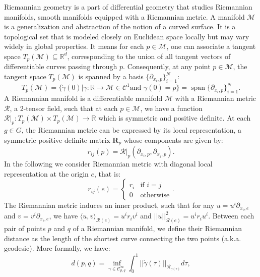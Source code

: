 \documentclass{article}
\DeclareMathOperator{\spn}{span}
\begin{document}
Riemannian geometry is a part of differential geometry that studies Riemannian manifolds, smooth manifolds equipped with a Riemannian metric. A manifold $\mathcal{M}$ is a generalization and abstraction of the notion of a curved surface. It is a topological set that is modeled closely on Euclidean space locally but may vary widely in global properties. It means for each $p \in \mathcal{M}$, one can associate a tangent space $T_p(\mathcal{M}) \subseteq \mathbb{R}^d$, corresponding to the union of all tangent vectors of differentiable curves passing through $p$. Consequently, at any point $p \in \mathcal{M}$, the tangent space $T_p(\mathcal{M})$ is spanned by a basis $\{\partial_{x_i, p} \}_{i=1}^N$:
\begin{equation}
T_p(\mathcal{M}) = \{ \dot{\gamma}(0) | \gamma : \mathbb{R} \to \mathcal{M} \in \mathcal{C}^1 \text{and } \gamma(0) = p\} = \spn\{\partial_{x_i,p} \}_{i=1}^N.
\end{equation}
A Riemannian manifold is a differentiable manifold $\mathcal{M}$ with a Riemannian metric $\mathcal{R}$, a 2-tensor field, such that at each $p \in \mathcal{M}$, we have a function $\mathcal{R}|_p : T_p (\mathcal{M}) \times T_p(\mathcal{M}) \to \mathbb{R}$ which is symmetric and positive definite. At each $g \in G$, the Riemannian metric can be expressed by its local representation, a symmetric positive definite matrix $\boldsymbol{R}_p$ whose components are given by:
\begin{equation}
r_{ij}(p) = \mathcal{R}|_p (\partial_{x_i, p}, \partial_{x_j, p}).
\end{equation}
In the following we consider Riemannian metric with  diagonal local representation at the origin $e$, that is:
\begin{equation}
r_{ij}(e) = \left\{
    \begin{array}{ll}
        r_{i} & \text{if } i = j  \\
        0 & \text{otherwise}
    \end{array}
\right..
\end{equation}
The Riemannian metric induces an inner product, such that for any $u = u^i \partial_{x_i, e}$ and $v = v^i \partial_{x_i, e}$, we have $\langle u, v \rangle_{\mathcal{R}(e)} = u^i r_i v^i$ and $|| u ||_{\mathcal{R}(e)}^2 = u^i r_i u^i$. Between each pair of points $p$ and $q$ of a Riemannian manifold, we define their Riemannian distance as the length of the shortest curve connecting the two points (a.k.a. geodesic). More formally, we have:
\begin{equation}
d(p, q) = \inf_{\gamma \in \mathcal{C}^\infty_{p, q}} \int_0^1 ||\dot{\gamma}(\tau)||_{\mathcal{R}_{\gamma(\tau)}} d\tau,
\end{equation}
\end{document}

